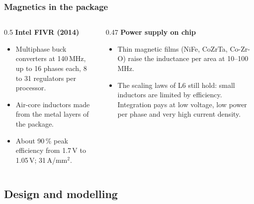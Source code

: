 \begin{frame}
	\frametitle{Magnetics in the package}
	\begin{columns}[T]
		\begin{column}{0.5\textwidth}
			\small
			\textbf{Intel FIVR (2014)}
			\begin{itemize}
				\item Multiphase buck converters at 140\,MHz, up to 16 phases each, 8 to 31 regulators per processor.
				\item Air-core inductors made from the metal layers of the package.
				\item About 90\,\% peak efficiency from 1.7\,V to 1.05\,V; 31\,A/mm$^2$.
			\end{itemize}
		\end{column}
		\begin{column}{0.47\textwidth}
			\small
			\textbf{Power supply on chip}
			\begin{itemize}
				\item Thin magnetic films (NiFe, CoZrTa, Co-Zr-O) raise the inductance per area at 10--100\,MHz.
				\item The scaling laws of L6 still hold: small inductors are limited by efficiency. Integration pays at low voltage, low power per phase and very high current density.
			\end{itemize}
		\end{column}
	\end{columns}
\end{frame}

\subsection{Design and modelling}

